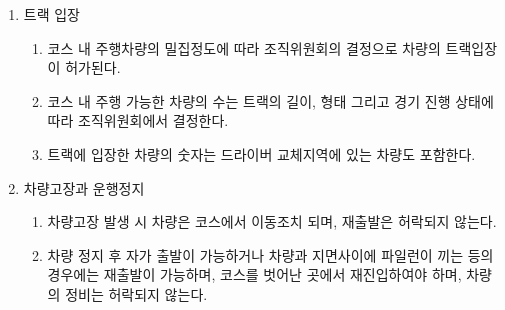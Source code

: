 \documentclass[final,a4paper,10pt]{report}
\begin{document}
{\begin{enumerate}
\begin{enumerate}
      \item\label{rule:formula-competition.endurance.driver-change-procedure.change-time-limit-3min} 드라이버 교체를 위해 3분의 시간이 주어지며, 3분이 경과된 후부터 초과된 시간은 전체 주행기록시간에 추가된다.
      \item\label{rule:formula-competition.endurance.driver-change-procedure.change-zone-headcount-eso} 드라이버 교체를 위한 지정된 공간에는 팀당 교체할 드라이버를 포함하여 3명의 인원만이 출입 가능하다. 전기동력 차량 팀의 경우 3명 중 한 명은 반드시 ESO이어야 한다.
      \item\label{rule:formula-competition.endurance.driver-change-procedure.tools-only-no-consumables} 두 번째 드라이버를 위한 차량조정이나 날씨에 따른 타이어 교체를 위한 공구만 휴대할 수 있고, 조정작업은 드라이버 승하차 전후에만 가능하며 소모품 교환은 허락되지 않는다.
      \item\label{rule:formula-competition.endurance.driver-change-procedure.extra-person-penalty-50pts} 드라이버 교체 구역에 다른 팀원이 출입할 경우 내구레이싱 경기 최종점수에서 1인당 50점이 감점된다.
    \end{enumerate}
  \item\label{rule:formula-competition.endurance.track-entry} 트랙 입장
    \begin{enumerate}
      \item\label{rule:formula-competition.endurance.track-entry.congestion-based-entry} 코스 내 주행차량의 밀집정도에 따라 조직위원회의 결정으로 차량의 트랙입장이 허가된다.
      \item\label{rule:formula-competition.endurance.track-entry.max-cars-on-track} 코스 내 주행 가능한 차량의 수는 트랙의 길이, 형태 그리고 경기 진행 상태에 따라 조직위원회에서 결정한다.
      \item\label{rule:formula-competition.endurance.track-entry.count-includes-change-zone} 트랙에 입장한 차량의 숫자는 드라이버 교체지역에 있는 차량도 포함한다.
    \end{enumerate}
  \item\label{rule:formula-competition.endurance.breakdown-and-stoppage} 차량고장과 운행정지
    \begin{enumerate}
      \item\label{rule:formula-competition.endurance.breakdown-and-stoppage.breakdown-no-restart} 차량고장 발생 시 차량은 코스에서 이동조치 되며, 재출발은 허락되지 않는다.
      \item\label{rule:formula-competition.endurance.breakdown-and-stoppage.self-restart-no-servicing} 차량 정지 후 자가 출발이 가능하거나 차량과 지면사이에 파일런이 끼는 등의 경우에는 재출발이 가능하며, 코스를 벗어난 곳에서 재진입하여야 하며, 차량의 정비는 허락되지 않는다.

\end{enumerate}
\end{enumerate}}
\end{document}
